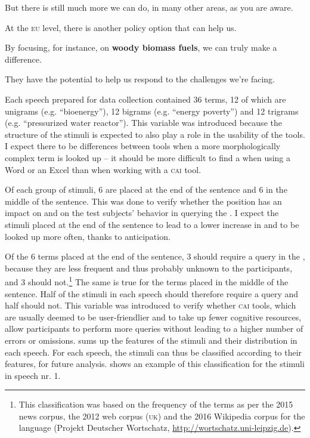 \documentclass[output=paper]{langsci/langscibook}
\begin{document}
But there is still much more we can do, in many other areas, as you are aware.

At the \textsc{eu} level, there is another policy option that can help us.

By focusing, for instance, on \textbf{woody biomass fuels}, we can truly make a difference.

They have the potential to help us respond to the challenges we’re facing.
\z

Each speech prepared for data collection contained 36 terms, 12 of which are unigrams (e.g. ``bioenergy''), 12 bigrams (e.g. ``energy poverty'') and 12 trigrams (e.g. ``pressurized water reactor''). This variable was introduced because the structure of the stimuli is expected to also play a role in the usability of the tools. I expect there to be differences between tools when a more morphologically complex term is looked up – it should be more difficult to find a  when using a Word or an Excel  than when working with a \textsc{cai} tool. 

Of each group of stimuli, 6 are placed at the end of the sentence and 6 in the middle of the sentence. This was done to verify whether the  position has an impact on  and on the test subjects’ behavior in querying the . I expect the stimuli placed at the end of the sentence to lead to a lower increase in  and to be looked up more often, thanks to anticipation. 

Of the 6 terms placed at the end of the sentence, 3 should require a query in the , because they are less frequent and thus probably unknown to the participants, and 3 should not.\footnote{This classification was based on the frequency of the terms as per the 2015 news corpus, the 2012 web corpus (\textsc{uk}) and the 2016 Wikipedia corpus for the  language (Projekt Deutscher Wortschatz, \url{http://wortschatz.uni-leipzig.de}).} The same is true for the terms placed in the middle of the sentence. Half of the stimuli in each speech should therefore require a query and half should not. This variable was introduced to verify whether \textsc{cai} tools, which are usually deemed to be user-friendlier and to take up fewer cognitive resources, allow participants to perform more queries without leading to a higher number of errors or omissions.  sums up the features of the stimuli and their distribution in each speech. For each speech, the stimuli can thus be classified according to their features, for future analysis.  shows an example of this classification for the stimuli in speech nr. 1.
\end{document}

